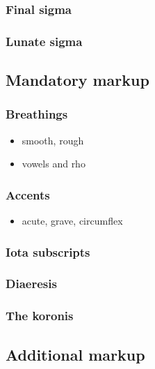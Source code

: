 \documentclass[11pt]{article}
\begin{document}
\subsubsection{Final sigma}
\label{sec:orga8e360f}

\subsubsection{Lunate sigma}
\label{sec:org2329d19}

\subsection{Mandatory markup}
\label{sec:orgd265787}

\subsubsection{Breathings}
\label{sec:org655b176}

\begin{itemize}
\item smooth, rough
\item vowels and rho
\end{itemize}

\subsubsection{Accents}
\label{sec:org77b4809}

\begin{itemize}
\item acute, grave, circumflex
\end{itemize}

\subsubsection{Iota subscripts}
\label{sec:org3912889}

\subsubsection{Diaeresis}
\label{sec:orgfe45653}

\subsubsection{The koronis}
\label{sec:org6d7880b}

\subsection{Additional markup}
\label{sec:orgcbaae6a}
\end{document}
